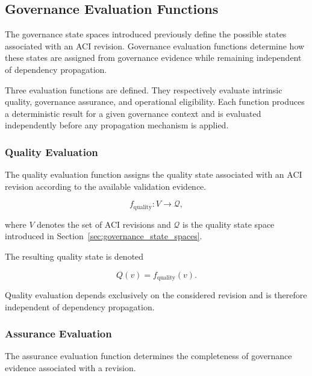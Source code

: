 \documentclass[10pt]{article}
\begin{document}
	\subsection{Governance Evaluation Functions}
	\label{sec:evaluation_functions}
	
	The governance state spaces introduced previously define the possible states associated with an ACI revision. Governance evaluation functions determine how these states are assigned from governance evidence while remaining independent of dependency propagation.
	
	Three evaluation functions are defined. They respectively evaluate intrinsic quality, governance assurance, and operational eligibility. Each function produces a deterministic result for a given governance context and is evaluated independently before any propagation mechanism is applied.
	
	\subsubsection{Quality Evaluation}
	
	The quality evaluation function assigns the quality state associated with an ACI revision according to the available validation evidence.
	
	\begin{equation}
		f_{\mathrm{quality}} : V \rightarrow \mathcal{Q},
		\label{eq:f_quality}
	\end{equation}
	
	where $V$ denotes the set of ACI revisions and $\mathcal{Q}$ is the quality state space introduced in Section~\ref{sec:governance_state_spaces}.
	
	The resulting quality state is denoted
	
	\begin{equation}
		Q(v)=f_{\mathrm{quality}}(v).
		\label{eq:quality_assignment}
	\end{equation}
	
	Quality evaluation depends exclusively on the considered revision and is therefore independent of dependency propagation.
	
	\subsubsection{Assurance Evaluation}
	
	The assurance evaluation function determines the completeness of governance evidence associated with a revision.
	
\end{document}
